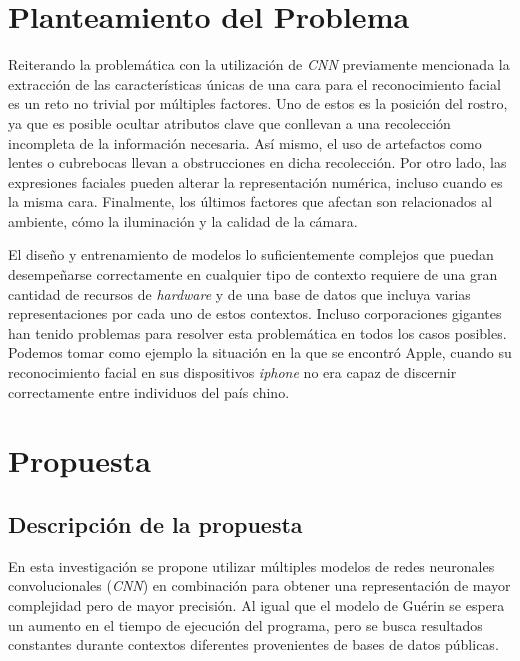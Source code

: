 \documentclass[letterpaper, 10 pt, conference]{ieeeconf}  %
\begin{document}
    \section{Planteamiento del Problema}
    Reiterando la problemática con la utilización de \textit{CNN} previamente mencionada
    la extracción de las características únicas de una cara para el reconocimiento facial
    es un reto no trivial por múltiples factores. Uno de estos es la posición del rostro,
    ya que es posible ocultar atributos clave que conllevan a una recolección incompleta
    de la información necesaria. Así mismo, el uso de artefactos como lentes o cubrebocas
    llevan a obstrucciones en dicha recolección. Por otro lado, las expresiones faciales
    pueden alterar la representación numérica, incluso cuando es la misma cara. Finalmente,
    los últimos factores que afectan son relacionados al ambiente, cómo la iluminación
    y la calidad de la cámara. \cite{Bodini2019}

    El diseño y entrenamiento de modelos lo suficientemente complejos que puedan desempeñarse
    correctamente en cualquier tipo de contexto requiere de una gran cantidad de recursos de
    \textit{hardware} y de una base de datos que incluya varias representaciones por cada uno
    de estos contextos. Incluso corporaciones gigantes han tenido problemas para resolver esta
    problemática en todos los casos posibles. Podemos tomar como ejemplo la situación en la que
    se encontró Apple, cuando su reconocimiento facial en sus dispositivos \textit{iphone} no
    era capaz de discernir correctamente entre individuos del país chino. \cite{Birchall2017}


    \section{Propuesta}

    \subsection{Descripción de la propuesta}
    En esta investigación se propone utilizar múltiples modelos de redes neuronales convolucionales
    (\textit{CNN}) en combinación para obtener una representación de mayor complejidad pero de
    mayor precisión. Al igual que el modelo de Guérin \cite{CombiningCNN} se espera un aumento 
    en el tiempo de ejecución del programa, pero se busca resultados constantes durante contextos
    diferentes provenientes de bases de datos públicas.
\end{document}

